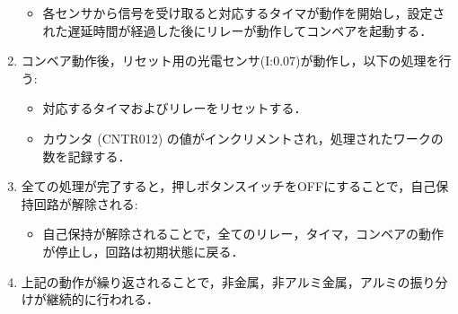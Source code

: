 \begin{enumerate}
\begin{itemize}
          \item 各センサから信号を受け取ると対応するタイマが動作を開始し，設定された遅延時間が経過した後にリレーが動作してコンベアを起動する．
        \end{itemize}
  \item コンベア動作後，リセット用の光電センサ(I:0.07)が動作し，以下の処理を行う:
        \begin{itemize}
          \item 対応するタイマおよびリレーをリセットする．
          \item カウンタ (CNTR012) の値がインクリメントされ，処理されたワークの数を記録する．
        \end{itemize}
  \item 全ての処理が完了すると，押しボタンスイッチをOFFにすることで，自己保持回路が解除される:
        \begin{itemize}
          \item 自己保持が解除されることで，全てのリレー，タイマ，コンベアの動作が停止し，回路は初期状態に戻る．
        \end{itemize}
  \item 上記の動作が繰り返されることで，非金属，非アルミ金属，アルミの振り分けが継続的に行われる．
\end{enumerate}

